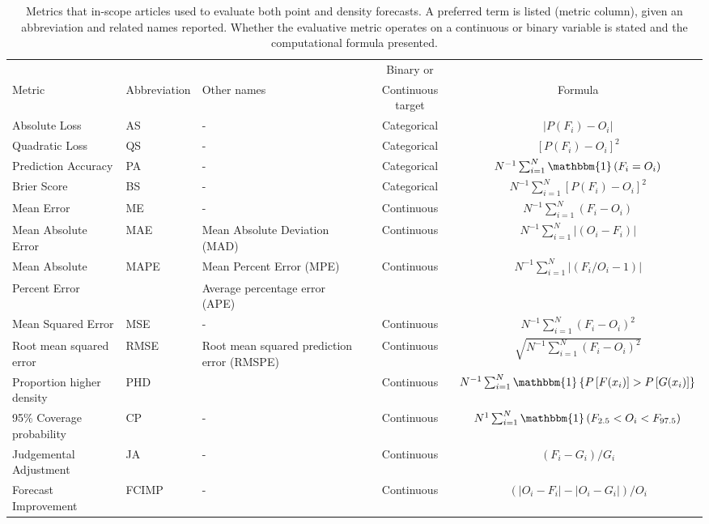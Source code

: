 \documentclass[preprint,authoryear,nonatbib]{elsarticle}
\def\l{\left}
\def\r{\right}
\begin{document}
\begin{sidewaystable}[ht!]
\begin{tabular}{L{4cm}C{3cm}C{4cm}cc}
    \hline
           &              &             & Binary or         &\\
    Metric & Abbreviation & Other names & Continuous target & Formula  \\
    \hline
    Absolute Loss  & AS                    & - & Categorical  &  $|P(F_{i}) - O_{i}|$\\
    Quadratic Loss & QS                    & - & Categorical  &  $\l[P(F_{i}) - O_{i}\r]^{2}$ \\
    Prediction Accuracy  & PA              & - & Categorical  &  $N^{-1} \sum_{i=1}^{N} \mathbbm{1}\l( F_{i} = O_{i} \r)$ \\
    Brier Score & BS                      & - & Categorical  &  $N^{-1} \sum_{i=1}^{N} \l[P(F_{i}) - O_{i}\r]^{2}$\\
    Mean Error & ME                       & - & Continuous   & $N^{-1} \sum_{i=1}^{N} (F_{i} - O_{i})$\\
    Mean Absolute Error & MAE             & Mean Absolute Deviation (MAD) & Continuous & $N^{-1} \sum_{i=1}^{N} |(O_{i} -F_{i} )|$\\
    Mean Absolute & MAPE    & Mean Percent Error (MPE)   & Continuous   & $N^{-1} \sum_{i=1}^{N} |(F_{i}/ O_{i} -1 )|$\\
    Percent Error                                       && Average percentage error (APE)\\
    Mean Squared Error & MSE              & - & Continuous & $N^{-1} \sum_{i=1}^{N} (F_{i} - O_{i})^{2}$ \\
    Root mean squared error & RMSE        & Root mean squared prediction error (RMSPE) & Continuous & $\sqrt{ N^{-1} \sum_{i=1}^{N} (F_{i} - O_{i})^{2}}$\\
    Proportion higher density & PHD       &  & Continuous & $N^{-1} \sum_{i=1}^{N} \mathbbm{1} \l\{ P\l[F(x_{i})\r] > P\l[G(x_{i})\r] \r\}$\\
    95\% Coverage probability & CP      & - & Continuous & $N^{1} \sum_{i=1}^{N} \mathbbm{1}\l( F_{2.5} < O_{i} < F_{97.5} \r)$ \\
    Judgemental Adjustment & JA        & - & Continuous & $\l(F_{i} - G_{i} \r)\Big/ G_{i}$ \\
    Forecast Improvement & FCIMP        & - & Continuous & $\l(|O_{i}-F_{i}| - |O_{i} - G_{i}| \r)\Big/ O_{i}$\\
    \hline
\end{tabular}
\caption{
\normalsize Metrics that in-scope articles used to evaluate both point and density forecasts.
A preferred term is listed (metric column), given an abbreviation and related names reported.
Whether the evaluative metric operates on a continuous or binary variable is stated and the computational formula presented. 
\label{tbl.metrics}}
\end{sidewaystable}
\end{document}

